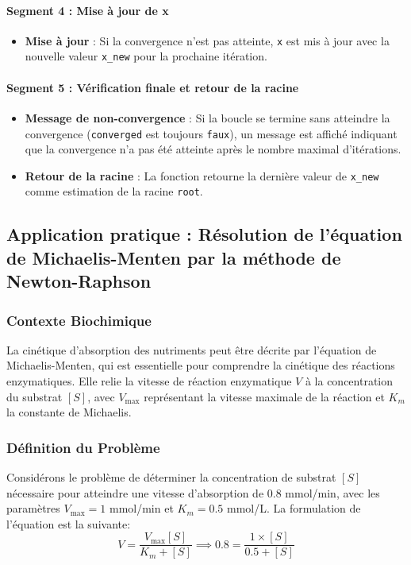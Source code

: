 \documentclass{article}
\begin{document}
\paragraph{Segment 4 : Mise à jour de x}
\begin{itemize}
    \item \textbf{Mise à jour} : Si la convergence n'est pas atteinte, \texttt{x} est mis à jour avec la nouvelle valeur \texttt{x\_new} pour la prochaine itération.
\end{itemize}

\paragraph{Segment 5 : Vérification finale et retour de la racine}
\begin{itemize}
    \item \textbf{Message de non-convergence} : Si la boucle se termine sans atteindre la convergence (\texttt{converged} est toujours \texttt{faux}), un message est affiché indiquant que la convergence n'a pas été atteinte après le nombre maximal d'itérations.
    \item \textbf{Retour de la racine} : La fonction retourne la dernière valeur de \texttt{x\_new} comme estimation de la racine \texttt{root}.
\end{itemize}

\subsection{Application pratique : Résolution de l'équation de Michaelis-Menten par la méthode de Newton-Raphson}
\subsubsection{Contexte Biochimique}
La cinétique d'absorption des nutriments peut être décrite par l'équation de Michaelis-Menten, qui est essentielle pour comprendre la cinétique des réactions enzymatiques. Elle relie la vitesse de réaction enzymatique \( V \) à la concentration du substrat \( [S] \), avec \( V_{\text{max}} \) représentant la vitesse maximale de la réaction et \( K_m \) la constante de Michaelis.

\subsubsection{Définition du Problème}
Considérons le problème de déterminer la concentration de substrat \( [S] \) nécessaire pour atteindre une vitesse d'absorption de \( 0.8 \) mmol/min, avec les paramètres \( V_{\text{max}} = 1 \) mmol/min et \( K_m = 0.5 \) mmol/L. La formulation de l'équation est la suivante:
\[
V = \frac{V_{\text{max}} [S]}{K_m + [S]} \implies 0.8 = \frac{1 \times [S]}{0.5 + [S]}
\]
\end{document}
